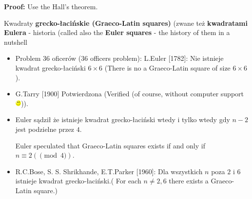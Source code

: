 \documentclass{beamer}
\begin{document}
\begin{frame}
  {\bf Proof:} Use the Hall's theorem.
  \end{frame}

\begin{frame}
  \begin{block}{Kwadraty {\bf grecko-łacińskie (Graeco-Latin squares)}
      (zwane też {\bf kwadratami Eulera}
      - historia (called also the {\bf Euler squares} - the history of them in a nutshell}
  \end{block}

  \begin{itemize}
  \item<1->
    {\color{blue} Problem 36 oficerów (36 officers problem)}:
    L.Euler [1782]: Nie istnieje kwadrat grecko-łaciński $6\times 6$
      (There is no a Graeco-Latin square of size $6 \times 6$).
  \item<2->G.Tarry [1900] Potwierdzona (Verified (of course, without computer
    support \includegraphics[height=3mm]{smile.png})).
  \item<3-> Euler sądził że istnieje kwadrat grecko-łaciński wtedy
    i tylko wtedy gdy $n - 2$ jest podzielne przez $4$.

    Euler speculated that Graeco-Latin squares exists if and
    only if $n \equiv 2 (\pmod 4)$.
  \item<4-> R.C.Bose, S. S. Shrikhande, E.T.Parker [1960]:
    Dla wszystkich $n$ poza $2$ i $6$ istnieje kwadrat
    grecko-łaciński.( For each $n \not= 2,6$ there exists a
    Graeco-Latin square.)
    \end{itemize}
\end{frame}
\end{document}
